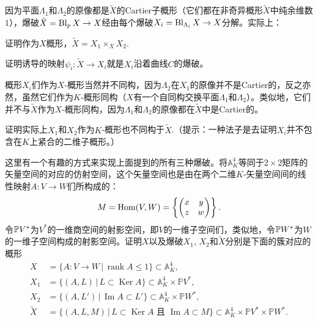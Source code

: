 因为平面$\Lambda_1$和$\Lambda_2$的原像都是$\tilde X$的Cartier子概形（它们都在非奇异概形$\tilde X$中纯余维数$1$），爆破$\tilde X=\operatorname{Bl}_pX\to X$经由每个爆破$X_i=\operatorname{Bl}_{\Lambda_i}X\to X$分解。实际上：

\begin{exe}\label{exe:4.31} 
	\begin{compactenum}[(a)]
		\item 证明作为$X$概形，$\tilde X=X_1\times_X X_2$.
		\item 证明诱导的映射$\psi_i:\tilde X\to X_i$就是$X_i$沿着曲线$C$的爆破。
	\end{compactenum}
\end{exe}

概形$X_i$们作为$X$-概形当然并不同构，因为$\Lambda_2$在$X_1$的原像并不是Cartier的，反之亦然，虽然它们作为$K$-概形同构（$X$有一个自同构交换平面$\Lambda_1$和$\Lambda_2$）。类似地，它们并不与$\tilde X$作为$X$-概形同构，因为$\Lambda_1$和$\Lambda_2$的原像都在$\tilde X$中是Cartier的。

\begin{exe}\label{exe:4.32} 
	证明实际上$X_1$和$X_2$作为$K$-概形也不同构于$\tilde X$.（提示：一种法子是去证明$X_i$并不包含在$K$上紧合的二维子概形。）
\end{exe}

\begin{exe}\label{exe:4.33} 
	这里有一个有趣的方式来实现上面提到的所有三种爆破。将$\mathbb A_K^4$等同于$2\times 2$矩阵的矢量空间的对应的仿射空间，这个矢量空间也是由在两个二维$K$-矢量空间间的线性映射$A:V\to W$们所构成的：
	\[
	M=\operatorname{Hom}(V,W)=\left\{\begin{pmatrix}x&y\\z&w\end{pmatrix}\right\}.
	\]
	令$\mathbb{P} V^*$为$V^*$的一维商空间的射影空间，即$V$的一维子空间们，类似地，令$\mathbb{P} W^*$为$W$的一维子空间构成的射影空间。证明$X$以及爆破$X_1$, $X_2$和$\tilde X$分别是下面的簇对应的概形
	\[
	\begin{aligned}
		X&=\{A:V\to W\,|\,\operatorname{rank}A\leq 1\}\subset \mathbb A_K^4,\\
		X_1&=\{(A,L)\,|\,L\subset \operatorname{Ker}A\}\subset \mathbb A_K^4\times \mathbb PV^*,\\
		X_2&=\{(A,L')\,|\,\operatorname{Im}A\subset L'\}\subset \mathbb A_K^4\times \mathbb PW^*,\\
		\tilde X&=\{(A,L,M)\,|\, L\subset \operatorname{Ker}A\text{ 且 }\operatorname{Im}A\subset M\}\subset \mathbb A_K^4\times \mathbb PV^*\times \mathbb PW^*.
	\end{aligned}
	\]
\end{exe}

